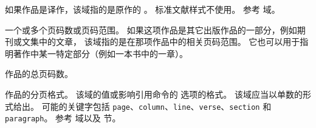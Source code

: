 \begin{fieldlist}


如果作品是译作，该域指的是原作的  。
标准文献样式不使用。
参考  域。




一个或多个页码数或页码范围。
如果这项作品是其它出版作品的一部分，例如期刊或文集中的文章，
该域指的是在那项作品中的相关页码范围。
它也可以用于指明著作中某一特定部分（例如一本书中的一章）。




作品的总页码数。




作品的分页格式。
该域的值或影响引用命令的  选项的格式。
该域应当以单数的形式给出。
可能的关键字包括 \texttt{page}、\texttt{column}、\texttt{line}、\texttt{verse}、\texttt{section} 和 \texttt{paragraph}。
参考  域以及  节。




\end{fieldlist}
